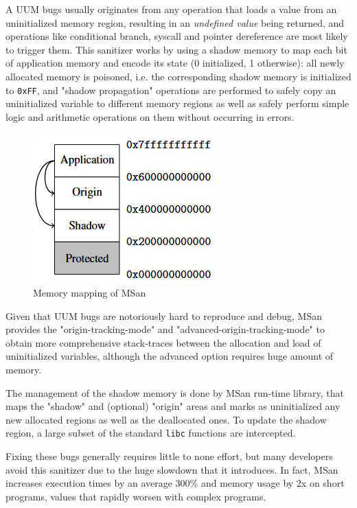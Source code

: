 A UUM bugs usually originates from any operation that loads a value from an uninitialized memory region, resulting in an \textit{undefined value} being returned, and operations like conditional branch, syscall and pointer dereference are most likely to trigger them. This sanitizer works by using a shadow memory to map each bit of application memory and encode its state (0 initialized, 1 otherwise): all newly allocated memory is poisoned, i.e. the corresponding shadow memory is initialized to \verb|0xFF|, and "shadow propagation" operations are performed to safely copy an uninitialized variable to different memory regions as well as safely perform simple logic and arithmetic operations on them without occurring in errors.

\begin{figure}[h]
\centering
\includegraphics[scale=0.68]{foto/shadow_memory_2.png}
\caption{Memory mapping of MSan \cite{stepanov2015memorysanitizer}}
\label{fig:msan_shadow}
\end{figure}

Given that UUM bugs are notoriously hard to reproduce and debug, MSan provides the "origin-tracking-mode" and "advanced-origin-tracking-mode" to obtain more comprehensive stack-traces between the allocation and load of uninitialized variables, although the advanced option requires huge amount of memory.

The management of the shadow memory is done by MSan run-time library, that maps the "shadow" and (optional) "origin" areas and marks as uninitialized any new allocated regions as well as the deallocated ones. To update the shadow region, a large subset of the standard \verb|libc| functions are intercepted.


Fixing these bugs generally requires little to none effort, but many developers avoid this sanitizer due to the huge slowdown that it introduces. In fact, MSan increases execution times by an average 300\% and memory usage by 2x on short programs, values that rapidly worsen with complex programs.

